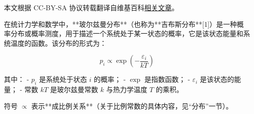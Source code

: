 
本文根据 CC-BY-SA 协议转载翻译自维基百科\href{https://en.wikipedia.org/wiki/Boltzmann_distribution}{相关文章}。

在统计力学和数学中，**玻尔兹曼分布**（也称为**吉布斯分布**[1]）是一种概率分布或概率测度，用于描述一个系统处于某一状态的概率，它是该状态能量和系统温度的函数。该分布的形式为：

\[
p_i \propto \exp\left(-\frac{\varepsilon_i}{kT}\right)
\]

其中：
- \( p_i \) 是系统处于状态 \( i \) 的概率；
- \( \exp \) 是指数函数；
- \( \varepsilon_i \) 是该状态的能量；
- 常数 \( kT \) 是玻尔兹曼常数 \( k \) 与热力学温度 \( T \) 的乘积。

符号 \( \propto \) 表示**成比例关系**（关于比例常数的具体内容，见“分布”一节）。